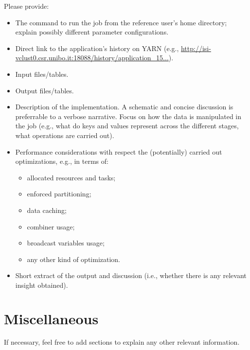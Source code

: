 \documentclass[hidelinks]{article}
\begin{document}
Please provide:
\begin{itemize}
\item The command to run the job from the reference user's home directory; explain possibly different parameter configurations.
\item Direct link to the application's history on YARN (e.g., \url{http://isi-vclust0.csr.unibo.it:18088/history/application_15...}).
\item Input files/tables.
\item Output files/tables.
\item Description of the implementation. A schematic and concise discussion is preferrable to a verbose narrative. Focus on how the data is manipulated in the job (e.g., what do keys and values represent across the different stages, what operations are carried out). 
\item Performance considerations with respect the (potentially) carried out optimizations, e.g., in terms of:
\begin{itemize}
\item allocated resources and tasks;
\item enforced partitioning;
\item data caching;
\item combiner usage;
\item broadcast variables usage;
\item any other kind of optimization.
\end{itemize}
\item Short extract of the output and discussion (i.e., whether there is any relevant insight obtained).
\end{itemize}

\section{Miscellaneous}

If necessary, feel free to add sections to explain any other relevant information.
\end{document}

